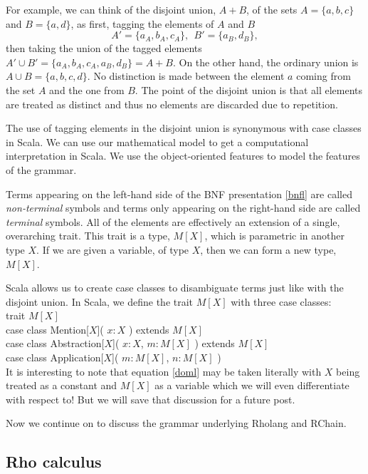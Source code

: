 \documentclass[12pt]{article}
\numberwithin{equation}{section}
\begin{document}
For example, we can think of the disjoint union, $A+B$, of the sets $A=\{ a, b, c \}$ and $B=\{ a, d \}$, as first, tagging the elements of $A$ and $B$
\[ A'=\{ a_A, b_A, c_A \}, \ \ B'=\{ a_B, d_B \},\]
then taking the union of the tagged elements $A' \cup B'=\{ a_A, b_A, c_A , a_B, d_B \}=A+B$. On the other hand, the ordinary union is $A \cup B=\{ a, b, c, d \}$. No distinction is made between the element $a$ coming from the set $A$ and the one from $B$. The point of the disjoint union is that all elements are treated as distinct and thus no elements are discarded due to repetition.

The use of tagging elements in the disjoint union is synonymous with case classes in Scala. We can use our mathematical model to get a computational interpretation in Scala. We use the object-oriented features to model the features of the grammar.

Terms appearing on the left-hand side of the BNF presentation \eqref{bnfl} are called \emph{non-terminal} symbols and terms only appearing on the right-hand side are called \emph{terminal} symbols. All of the elements are effectively an extension of a single, overarching trait. This trait is a type, $M[X]$, which is parametric in another type $X$. If we are given a variable, of type $X$, then we can form a new type, $M[X]$.

Scala allows us to create case classes to disambiguate terms just like with the disjoint union. In Scala, we define the trait $M[X]$ with three case classes:  \\

\indent trait $M[X]$ \\
\indent case class Mention[$X$]( $x : X$ ) extends $M[X]$ \\
\indent case class Abstraction[$X$]( $x : X$, $m : M[X]$ ) extends $M[X]$ \\
\indent case class Application[$X$]( $m : M[X]$, $n : M[X]$ ) \\

It is interesting to note that equation \eqref{doml} may be taken literally with $X$ being treated as a constant and $M[X]$ as a variable which we will even differentiate with respect to! But we will save that discussion for a future post.

Now we continue on to discuss the grammar underlying Rholang and RChain.

\subsection{Rho calculus}
\end{document}
